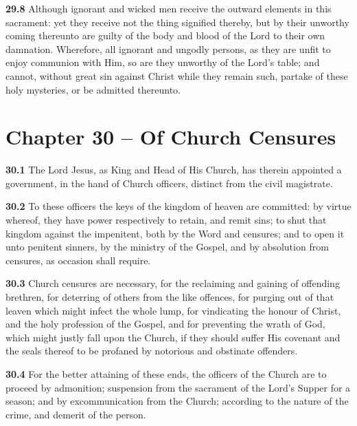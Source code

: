 \par\textbf{29.8} Although ignorant and wicked men receive the outward elements in this sacrament: yet they receive not the thing signified thereby, but by their unworthy coming thereunto are guilty of the body and blood of the Lord to their own damnation. Wherefore, all ignorant and ungodly persons, as they are unfit to enjoy communion with Him, so are they unworthy of the Lord's table; and cannot, without great sin against Christ while they remain such, partake of these holy mysteries, or be admitted thereunto.  

\section{Chapter 30 -- Of Church Censures}

\par\textbf{30.1} The Lord Jesus, as King and Head of His Church, has therein appointed a government, in the hand of Church officers, distinct from the civil magistrate.   

\par\textbf{30.2} To these officers the keys of the kingdom of heaven are committed: by virtue whereof, they have power respectively to retain, and remit sins; to shut that kingdom against the impenitent, both by the Word and censures; and to open it unto penitent sinners, by the ministry of the Gospel, and by absolution from censures, as occasion shall require.   

\par\textbf{30.3} Church censures are necessary, for the reclaiming and gaining of offending brethren, for deterring of others from the like offences, for purging out of that leaven which might infect the whole lump, for vindicating the honour of Christ, and the holy profession of the Gospel, and for preventing the wrath of God, which might justly fall upon the Church, if they should suffer His covenant and the seals thereof to be profaned by notorious and obstinate offenders.   

\par\textbf{30.4} For the better attaining of these ends, the officers of the Church are to proceed by admonition; suspension from the sacrament of the Lord's Supper for a season; and by excommunication from the Church; according to the nature of the crime, and demerit of the person.  

